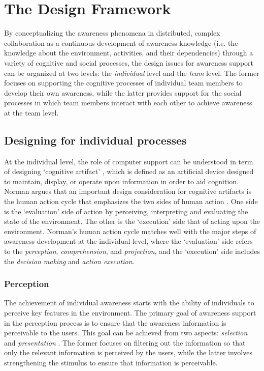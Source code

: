 \section{The Design Framework} %
\label{sec:the_design_space}
By conceptualizing the awareness phenomena in distributed, complex collaboration as a continuous development of awareness knowledge (i.e. the knowledge about the environment, activities, and their dependencies) through a variety of cognitive and social processes, the design issues for awareness support can be organized at two levels: the \emph{individual} level and the \emph{team} level. The former focuses on supporting the cognitive processes of individual team members to develop their own awareness, while the latter provides support for the social processes in which team members interact with each other to achieve awareness at the team level. 


\subsection{Designing for individual processes} %
\label{sub:designing_for_individuals}
At the individual level, the role of computer support can be understood in term of designing `cognitive artifact' \cite{Norman1992}, which is defined as an artificial device designed to maintain, display, or operate upon information in order to aid cognition. Norman argues that an important design consideration for cognitive artifacts is the human action cycle that emphasizes the two sides of human action \cite{Norman1992}. One side is the `evaluation' side of action by perceiving, interpreting and evaluating the state of the environment. The other is the `execution' side that of acting upon the environment. Norman's human action cycle matches well with the major steps of awareness development at the individual level, where the `evaluation' side refers to the \emph{perception}, \emph{comprehension}, and \emph{projection}, and the `execution' side includes the \emph{decision making} and \emph{action execution}.

\subsubsection*{Perception} %
\label{ssub:perception}

The achievement of individual awareness starts with the ability of individuals to perceive key features in the environment. The primary goal of awareness support in the perception process is to ensure that the awareness information is perceivable to the users. This goal can be achieved from two aspects: \emph{selection} and \emph{presentation} \cite{Berlage1999}. The former focuses on filtering out the information so that only the relevant information is perceived by the users, while the latter involves strengthening the stimulus to ensure that information is perceivable.

